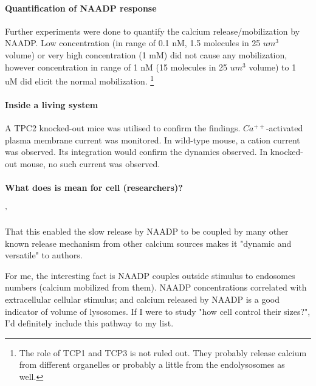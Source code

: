 \documentclass[twocolumn]{article}
\begin{document}
\paragraph{Quantification of NAADP response} Further experiments were done to
quantify the calcium release/mobilization by NAADP. Low concentration (in range
of 0.1 nM, 1.5 molecules in 25 $um^3$ volume) or very high concentration  (1 mM)
did not cause any mobilization, however concentration in range of 1 nM (15
molecules in 25 $um^3$ volume) to 1 uM did  elicit the normal mobilization.
\footnote{The role of TCP1 and TCP3 is not ruled out. They probably release
    calcium from different organelles or probably a little from the
    endolysosomes as well.}

\paragraph{Inside a living system}
A TPC2 knocked-out mice was utilised to confirm the findings.
$Ca^{++}$-activated plasma membrane current was monitored. In wild-type mouse, a
cation current was observed. Its integration would confirm the dynamics
observed. In knocked-out mouse, no such current was observed.

\paragraph{What does is mean for cell (researchers)?}'

That this enabled the slow release by NAADP to be coupled by many other known
release mechanism from other calcium sources makes it "dynamic and versatile" to
authors.  

For me, the interesting fact is NAADP couples outside stimulus to endosomes
numbers (calcium mobilized from them).  NAADP concentrations correlated with
extracellular cellular stimulus; and calcium released by NAADP is a good
indicator of volume of lysosomes. If I were to study "how cell control their
sizes?", I'd definitely include this pathway to my list.


        
\end{document}
